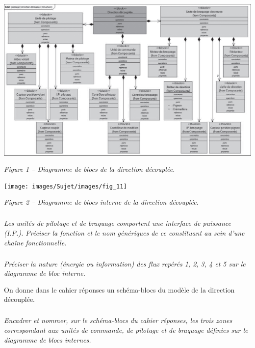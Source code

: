 \documentclass[10pt,fleqn]{article} %
\begin{document}
\begin{center}
\includegraphics[width=\linewidth]{images/Sujet/images/fig_10}

\textit{Figure 1 -- Diagramme de blocs de la direction découplée.}
\end{center}
\begin{center}
\texttt{[image: images/Sujet/images/fig\_11]}

\textit{Figure 2 -- Diagramme de blocs interne de la direction découplée.}
\end{center}

\subparagraph{}
\textit{Les unités de pilotage et de braquage comportent une interface de puissance (I.P.). Préciser la
fonction et le nom génériques de ce constituant au sein d'une chaîne fonctionnelle.}

\subparagraph{}
\textit{Préciser la nature (énergie ou information) des flux repérés 1, 2, 3, 4 et 5 sur le diagramme de bloc
interne.}
\ifprof
\begin{corrige}
\end{corrige}
\else
\fi

On donne dans le cahier réponses un schéma-blocs du modèle de la direction découplée.




\subparagraph{}
\textit{Encadrer et nommer, sur le schéma-blocs du cahier réponses, les trois zones correspondant aux
unités de commande, de pilotage et de braquage définies sur le diagramme de blocs internes.}
\ifprof
\begin{corrige}
\end{corrige}
\else
\fi
\end{document}
